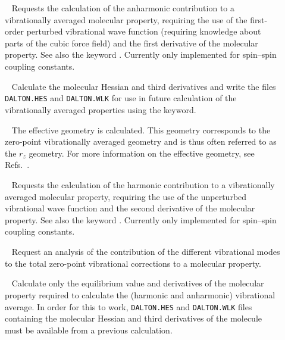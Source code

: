 \begin{description}

\item[]\verb| |\newline
Requests the calculation of the anharmonic contribution to a
vibrationally averaged molecular property, requiring the use of the
first-order perturbed vibrational wave function (requiring knowledge
about parts of the cubic force field) and the first derivative of the
molecular property. See also the keyword . Currently only
implemented for spin--spin coupling constants.

\item[]\verb| |\newline
Calculate the molecular Hessian and third derivatives and write the files
\verb|DALTON.HES| and \verb|DALTON.WLK| for use in future
calculation of the vibrationally averaged properties using the
 keyword.

\item[]\verb| |\newline
The effective geometry is calculated. This geometry corresponds to the
zero-point vibrationally averaged geometry and is thus often referred
to as the $r_z$ geometry. For more information on the effective
geometry, see Refs.~\cite{poakrprtjcp112,krpoaprtjcp112}.

\item[]\verb| |\newline
Requests the calculation of the harmonic contribution to a
vibrationally averaged molecular property, requiring the use of the
unperturbed vibrational wave function and the second derivative of the
molecular property. See also the keyword . Currently only
implemented for spin--spin coupling constants.

\item[]\verb| |\newline
Request an analysis of the contribution of the different vibrational modes
to the total zero-point vibrational corrections to a molecular property.

\item[]\verb| |\newline
Calculate only the equilibrium value and derivatives of the molecular property
required to calculate the (harmonic and anharmonic) vibrational average.
In order for this to work, \verb|DALTON.HES| and \verb|DALTON.WLK| files containing the molecular Hessian
and third derivatives of the molecule must be available from a previous calculation.


\end{description}
